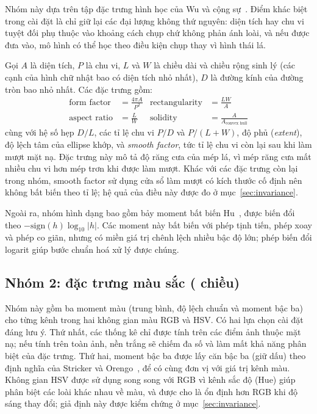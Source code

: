 \documentclass[11pt,a4paper]{article}
\begin{document}
Nhóm này dựa trên tập đặc trưng hình học của Wu và cộng sự~\cite{wu2007}. Điểm khác biệt trong cài
đặt là chỉ giữ lại các đại lượng không thứ nguyên: diện tích hay chu vi tuyệt đối phụ thuộc vào
khoảng cách chụp chứ không phản ánh loài, và nếu được đưa vào, mô hình có thể học theo điều kiện
chụp thay vì hình thái lá.

Gọi $A$ là diện tích, $P$ là chu vi, $L$ và $W$ là chiều dài và chiều rộng sinh lý (các cạnh của hình
chữ nhật bao có diện tích nhỏ nhất), $D$ là đường kính của đường tròn bao nhỏ nhất. Các đặc trưng gồm:
\begin{align*}
\text{form factor} &= \frac{4\pi A}{P^2} & \text{rectangularity} &= \frac{LW}{A} \\
\text{aspect ratio} &= \frac{L}{W} & \text{solidity} &= \frac{A}{A_{\text{convex hull}}}
\end{align*}
cùng với hệ số hẹp $D/L$, các tỉ lệ chu vi $P/D$ và $P/(L{+}W)$, độ phủ (\emph{extent}), độ lệch tâm
của ellipse khớp, và \emph{smooth factor}, tức tỉ lệ chu vi còn lại sau khi làm mượt mặt nạ. Đặc
trưng này mô tả độ răng cưa của mép lá, vì mép răng cưa mất nhiều chu vi hơn mép trơn khi được làm
mượt. Khác với các đặc trưng còn lại trong nhóm, smooth factor sử dụng cửa sổ làm mượt có kích thước
cố định nên không bất biến theo tỉ lệ; hệ quả của điều này được đo ở mục~\ref{sec:invariance}.

Ngoài ra, nhóm hình dạng bao gồm bảy moment bất biến Hu~\cite{hu1962}, được biến đổi theo
$-\mathrm{sign}(h)\log_{10}|h|$. Các moment này bất biến với phép tịnh tiến, phép xoay và phép co
giãn, nhưng có miền giá trị chênh lệch nhiều bậc độ lớn; phép biến đổi logarit giúp bước chuẩn hoá
xử lý được chúng.

\subsection{Nhóm 2: đặc trưng màu sắc ( chiều)}
\label{sec:color}

Nhóm này gồm ba moment màu (trung bình, độ lệch chuẩn và moment bậc ba) cho từng kênh trong hai
không gian màu RGB và HSV. Có hai lựa chọn cài đặt đáng lưu ý. Thứ nhất, các thống kê chỉ được tính
trên các điểm ảnh thuộc mặt nạ; nếu tính trên toàn ảnh, nền trắng sẽ chiếm đa số và làm mất khả năng
phân biệt của đặc trưng. Thứ hai, moment bậc ba được lấy căn bậc ba (giữ dấu) theo định nghĩa của
Stricker và Orengo~\cite{stricker1995}, để có cùng đơn vị với giá trị kênh màu. Không gian HSV được
sử dụng song song với RGB vì kênh sắc độ (Hue) giúp phân biệt các loài khác nhau về màu, và được cho
là ổn định hơn RGB khi độ sáng thay đổi; giả định này được kiểm chứng ở mục~\ref{sec:invariance}.
\end{document}
